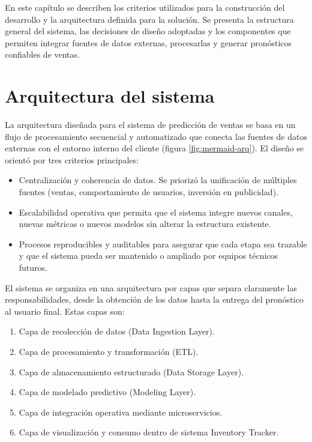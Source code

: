 En este capítulo se describen los criterios utilizados para la construcción del desarrollo y la arquitectura definida para la solución. Se presenta la estructura general del sistema, las decisiones de diseño adoptadas y los componentes que permiten integrar fuentes de datos externas, procesarlas y generar pronósticos confiables de ventas.

\section{Arquitectura del sistema}

La arquitectura diseñada para el sistema de predicción de ventas se basa en un flujo de procesamiento secuencial y automatizado que conecta las fuentes de datos externas con el entorno interno del cliente (figura \ref{fig:mermaid-arq}). El diseño se orientó por tres criterios principales:

\begin{itemize}


\item Centralización y coherencia de datos. Se priorizó la unificación de múltiples fuentes (ventas, comportamiento de usuarios, inversión en publicidad).

\item Escalabilidad operativa que permita que el sistema integre nuevos canales, nuevas métricas o nuevos modelos sin alterar la estructura existente.

\item Procesos reproducibles y auditables para asegurar que cada etapa sea trazable y que el sistema pueda ser mantenido o ampliado por equipos técnicos futuros.

\end{itemize}

El sistema se organiza en una arquitectura por capas que separa claramente las responsabilidades, desde la obtención de los datos hasta la entrega del pronóstico al usuario final. Estas capas son:

\begin{enumerate}

\item Capa de recolección de datos (Data Ingestion Layer).

\item Capa de procesamiento y transformación (ETL).

\item Capa de almacenamiento estructurado (Data Storage Layer).

\item Capa de modelado predictivo (Modeling Layer).

\item Capa de integración operativa mediante microservicios.

\item Capa de visualización y consumo dentro de sistema Inventory Tracker.

\end{enumerate}

